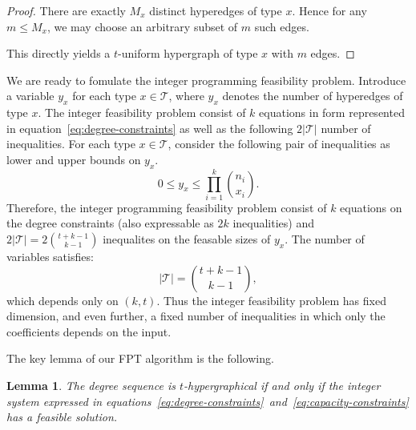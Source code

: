\documentclass[pdflatex,sn-mathphys-num]{sn-jnl}%
\theoremstyle{thmstyleone}%
\newtheorem{lemma}{Lemma}
\theoremstyle{thmstyletwo}%
\theoremstyle{thmstylethree}%
\begin{document}
\begin{proof}
There are exactly $M_x$ distinct hyperedges of type $x$. Hence for any $m \le M_x$, we may choose an arbitrary subset of $m$ such edges.

This directly yields a $t$-uniform hypergraph of type $x$ with $m$ edges.
\end{proof}




We are ready to fomulate the integer programming feasibility problem. Introduce a variable $y_x$ for each type $x \in \mathcal{T}$, where $y_x$ denotes the number of hyperedges of type $x$. The integer feasibility problem consist of $k$ equations in form represented in equation~\ref{eq:degree-constraints} as well as the following $2|\mathcal{T}|$ number of inequalities.
For each type $x \in \mathcal{T}$, consider the following pair of inequalities as lower and upper bounds on $y_x$.
\begin{equation}
0 \le y_x \le \prod_{i=1}^k {n_i\choose x_i}. \label{eq:capacity-constraints}    
\end{equation}
Therefore, the integer programming feasibility problem consist of $k$ equations on the degree constraints (also expressable as $2k$ inequalities) and $2|\mathcal{T}| = 2{t+k-1\choose k-1}$ inequalites on the feasable sizes of $y_x$. The number of variables satisfies:
\[
|\mathcal{T}| = \binom{t+k-1}{k-1},
\]
which depends only on $(k,t)$.
Thus the integer feasibility problem has fixed dimension, and even further, a fixed number of inequalities in which only the coefficients depends on the input.

The key lemma of our FPT algorithm is the following.

\begin{lemma}\label{lem:ip_equivalence}
The degree sequence is $t$-hypergraphical if and only if the integer system expressed in equations~\ref{eq:degree-constraints}~and~\ref{eq:capacity-constraints} has a feasible solution.
\end{lemma}
\end{document}
